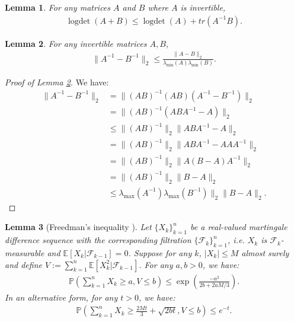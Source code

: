 \documentclass{article} \usepackage{iclr2023/iclr2023_conference,times}
\DeclareMathOperator*{\logdet}{logdet}
\newtheorem{lemma}{Lemma}[section]
\begin{document}
\begin{lemma}
For any matrices $A$ and $B$ where $A$ is invertible, 
\begin{align*}
    \logdet(A + B) \leq \logdet(A) + tr(A^{-1} B). 
\end{align*}
\end{lemma}

\begin{lemma}
For any invertible matrices $A, B$, 
\begin{align*}
    \| A^{-1} - B^{-1} \|_2 \leq \frac{\| A - B\|_2}{ \lambda_{\min}(A) \lambda_{\min}(B) }. 
\end{align*}
\label{lemma: difference of two inverse matrices}
\end{lemma}
\begin{proof}[Proof of Lemma \ref{lemma: difference of two inverse matrices}]
We have: 
\begin{align*}
    \|A^{-1} - B^{-1} \|_2 &= \| (AB)^{-1} (AB) (A^{-1} - B^{-1}) \|_2 \\
    &=\| (AB)^{-1} (ABA^{-1} - A) \|_2 \\ 
    &\leq \| (AB)^{-1} \|_2 \| ABA^{-1} - A \|_2 \\ 
    &= \| (AB)^{-1} \|_2 \| ABA^{-1} - AAA^{-1} \|_2 \\ 
    &= \| (AB)^{-1} \|_2 \| A(B - A)A^{-1} \|_2 \\ 
    &= \| (AB)^{-1} \|_2 \| B - A \|_2 \\ 
    &\leq \lambda_{\max}(A^{-1}) \lambda_{\max}(B^{-1}) \|_2 \| B - A \|_2.
\end{align*}
\end{proof}




\begin{lemma}[Freedman's inequality \citep{tropp2011freedman}]
Let $\{X_k\}_{k=1}^n$ be a real-valued martingale difference sequence with the corresponding filtration $\{\mathcal{F}_k\}_{k=1}^n$, i.e. $X_k$ is $\mathcal{F}_{k}$-measurable and $\mathbb{E}[X_k | \mathcal{F}_{k-1}] = 0$. Suppose for any $k$, $|X_k| \leq M$ almost surely and define $V:= \sum_{k=1}^n \mathbb{E}\left[ X_k^2 | \mathcal{F}_{k-1} \right]$. For any $a,b > 0$, we have:
\begin{align*}
    \mathbb{P}\left( \sum_{k=1}^n X_k \geq a, V \leq b \right) \leq \exp \left( \frac{-a^2}{2b + 2 a M/3} \right). 
\end{align*}
In an alternative form, for any $t > 0$, we have: 
\begin{align*}
    \mathbb{P}\left( \sum_{k=1}^n X_k \geq  \frac{2Mt}{3} + \sqrt{2bt}, V \leq b \right) \leq e^{-t} . 
\end{align*}
\label{lemma:freedman}
\end{lemma}
\end{document}

